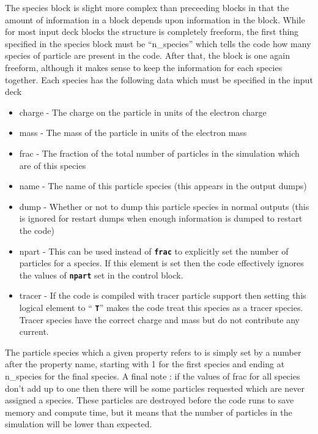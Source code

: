 \documentclass[12pt,a4paper]{article}
\newcommand{\inlinecode}[1]{{\color{warwickred} \bf\texttt{#1}}}
\begin{document}
The species block is slight more complex than preceeding blocks in that the
amount of information in a block depends upon information in the block. While
for most input deck blocks the structure is completely freeform, the first
thing specified in the species block must be ``n\_species'' which tells the
code how many species of particle are present in the code. After that, the
block is one again freeform, although it makes sense to keep the information
for each species together. Each species has the following data which must be
specified in the input deck\\
\begin{itemize}
\item charge - The charge on the particle in units of the electron charge
\item mass - The mass of the particle in units of the electron mass
\item frac - The fraction of the total number of particles in the simulation
  which are of this species
\item name - The name of this particle species (this appears in the output
  dumps)
\item dump - Whether or not to dump this particle species in normal outputs
  (this is ignored for restart dumps when enough information is dumped to
  restart the code)
\item npart - This can be used instead of \inlinecode{frac} to explicitly set
  the number of particles for a species. If this element is set then the code
  effectively ignores the values of \inlinecode{npart} set in the control
  block.
\item tracer - If the code is compiled with tracer particle support then
  setting this logical element to ``\inlinecode{T}'' makes the code treat this
  species as a tracer species. Tracer species have the correct charge and mass
  but do not contribute any current.
\end{itemize}

The particle species which a given property refers to is simply set by a
number after the property name, starting with 1 for the first species and
ending at n\_species for the final species. A final note : if the values of
frac for all species don't add up to one then there will be some particles
requested which are never assigned a species. These particles are destroyed
before the code runs to save memory and compute time, but it means that the
number of particles in the simulation will be lower than expected.\\
\end{document}
